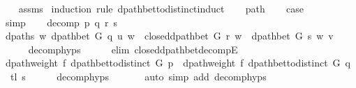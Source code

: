 \begin{isabellebody}
\endisataginvisible
{\isafoldinvisible}%
%
\isadeliminvisible
\isanewline
%
\endisadeliminvisible
%
\isadelimproof
\ \ %
\endisadelimproof
%
\isatagproof
{}\isamarkupfalse%
\ assms\isanewline
{}\isamarkupfalse%
\ {\isacharparenleft}{\kern0pt}induction\ rule{\isacharcolon}{\kern0pt}\ dpath{\isacharunderscore}{\kern0pt}bet{\isacharunderscore}{\kern0pt}to{\isacharunderscore}{\kern0pt}distinct{\isacharunderscore}{\kern0pt}induct{\isacharparenright}{\kern0pt}\isanewline
\ \ \isamarkupfalse%
\ path\isanewline
\ \ \isamarkupfalse%
\ {\isacharquery}{\kern0pt}case\isanewline
\ \ \ \ \isamarkupfalse%
\ simp\isanewline
{}\isamarkupfalse%
\isanewline
\ \ \isamarkupfalse%
\ {\isacharparenleft}{\kern0pt}decomp\ p\ q\ r\ s{\isacharparenright}{\kern0pt}\isanewline
\ \ \isamarkupfalse%
\ dpaths{\isacharcolon}{\kern0pt}\ {\isachardoublequoteopen}{\isasymexists}w{\isachardot}{\kern0pt}\ dpath{\isacharunderscore}{\kern0pt}bet\ G\ q\ u\ w\ {\isasymand}\ closed{\isacharunderscore}{\kern0pt}dpath{\isacharunderscore}{\kern0pt}bet\ G\ r\ w\ {\isasymand}\ dpath{\isacharunderscore}{\kern0pt}bet\ G\ s\ w\ v{\isachardoublequoteclose}\isanewline
\ \ \ \ \isamarkupfalse%
\ decomp{\isachardot}{\kern0pt}hyps\isanewline
\ \ \ \ \isamarkupfalse%
\ {\isacharparenleft}{\kern0pt}elim\ closed{\isacharunderscore}{\kern0pt}dpath{\isacharunderscore}{\kern0pt}bet{\isacharunderscore}{\kern0pt}decompE{\isacharunderscore}{\kern0pt}{}{\isacharparenright}{\kern0pt}\isanewline
\isanewline
\ \ \isamarkupfalse%
\ {\isachardoublequoteopen}dpath{\isacharunderscore}{\kern0pt}weight\ f\ {\isacharparenleft}{\kern0pt}dpath{\isacharunderscore}{\kern0pt}bet{\isacharunderscore}{\kern0pt}to{\isacharunderscore}{\kern0pt}distinct\ G\ p{\isacharparenright}{\kern0pt}\ {\isacharequal}{\kern0pt}\ dpath{\isacharunderscore}{\kern0pt}weight\ f\ {\isacharparenleft}{\kern0pt}dpath{\isacharunderscore}{\kern0pt}bet{\isacharunderscore}{\kern0pt}to{\isacharunderscore}{\kern0pt}distinct\ G\ {\isacharparenleft}{\kern0pt}q\ {\isacharat}{\kern0pt}\ tl\ s{\isacharparenright}{\kern0pt}{\isacharparenright}{\kern0pt}{\isachardoublequoteclose}\isanewline
\ \ \ \ \isamarkupfalse%
\ decomp{\isachardot}{\kern0pt}hyps{\isacharparenleft}{\kern0pt}{}{\isacharcomma}{\kern0pt}\ {}{\isacharparenright}{\kern0pt}\isanewline
\ \ \ \ \isamarkupfalse%
\ {\isacharparenleft}{\kern0pt}auto\ simp\ add{\isacharcolon}{\kern0pt}\ decomp{\isachardot}{\kern0pt}hyps{\isacharparenleft}{\kern0pt}{}{\isacharparenright}{\kern0pt}{\isacharparenright}{\kern0pt}\isanewline

\end{isabellebody}
